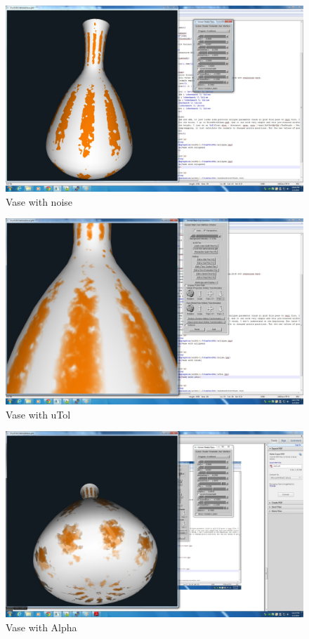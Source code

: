 \documentclass[12pt,letterpaper]{article}
\begin{document}
\begin{figure}[p]
    \centering
    \includegraphics[width=1.0\textwidth]{noise.jpg}
    \caption{Vase with noise}
\end{figure}

\begin{figure}[p]
    \centering
    \includegraphics[width=1.0\textwidth]{uTol.jpg}
    \caption{Vase with uTol}
\end{figure}

\begin{figure}[p]
    \centering
    \includegraphics[width=1.0\textwidth]{Alpha.jpg}
    \caption{Vase with Alpha}
\end{figure}
\end{document}
